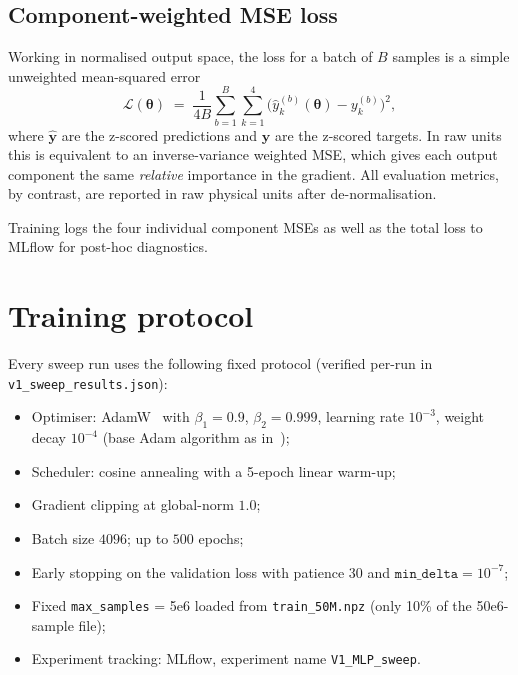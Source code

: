 \documentclass[a4paper,11pt]{article}
\newcommand{\num}[1]{#1}
\newcommand{\loss}{\mathcal{L}}
\newcommand{\btheta}{\bm{\theta}}
\begin{document}
\subsection{Component-weighted MSE loss}

Working in normalised output space, the loss for a batch of $B$ samples
is a simple unweighted mean-squared error
\begin{equation}
\loss(\btheta) \;=\; \frac{1}{4B}\sum_{b=1}^{B}\sum_{k=1}^{4}
\bigl(\hat{y}^{(b)}_{k}(\btheta) - y^{(b)}_{k}\bigr)^{2},
\label{gen1:eq:loss}
\end{equation}
where $\hat{\mathbf{y}}$ are the z-scored predictions and $\mathbf{y}$ are
the z-scored targets. In raw units this is equivalent to an inverse-variance
weighted MSE, which gives each output component the same \emph{relative}
importance in the gradient. All evaluation metrics, by contrast, are
reported in raw physical units after de-normalisation.

Training logs the four individual component MSEs as well as the total loss
to MLflow for post-hoc diagnostics.

\section{Training protocol}\label{gen1:sec:training}

Every sweep run uses the following fixed protocol (verified per-run in
\texttt{v1\_sweep\_results.json}):
\begin{itemize}\setlength{\itemsep}{1pt}
\item Optimiser: AdamW~\cite{LoshchilovHutter2019} with
  $\beta_1=0.9$, $\beta_2=0.999$, learning rate $10^{-3}$, weight decay
  $10^{-4}$ (base Adam algorithm as in~\cite{KingmaBa2015});
\item Scheduler: cosine annealing with a 5-epoch linear warm-up;
\item Gradient clipping at global-norm $1.0$;
\item Batch size $4096$; up to $500$ epochs;
\item Early stopping on the validation loss with patience $30$ and
  $\texttt{min\_delta}=10^{-7}$;
\item Fixed \texttt{max\_samples} = \num{5e6} loaded from
  \texttt{train\_50M.npz} (only 10\% of the \num{50e6}-sample file);
\item Experiment tracking: MLflow, experiment name \texttt{V1\_MLP\_sweep}.
\end{itemize}
\end{document}
